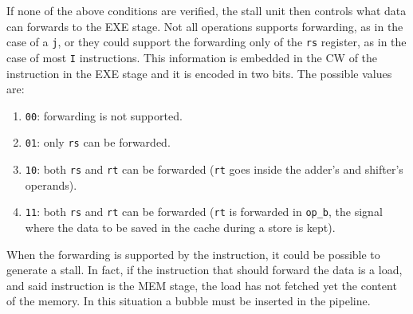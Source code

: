 If none of the above conditions are verified, the stall unit then controls what data can forwards to the EXE stage. Not all operations supports forwarding, as in the case of a \verb|j|, or they could support the
forwarding only of the \verb|rs| register, as in the case of most \verb|I| instructions. This information is embedded in the CW of the instruction in the EXE stage and it is encoded in two bits. The possible values are:

\begin{enumerate}
    \item \verb|00|: forwarding is not supported.
    \item \verb|01|: only \verb|rs| can be forwarded.
    \item \verb|10|: both \verb|rs| and \verb|rt| can be forwarded (\verb|rt| goes inside the adder's and shifter's operands).
    \item \verb|11|: both \verb|rs| and \verb|rt| can be forwarded (\verb|rt| is forwarded in \verb|op_b|, the signal where the data to be saved in the cache during a store is kept).
\end{enumerate}

When the forwarding is supported by the instruction, it could be possible to generate a stall. In fact, if the instruction that should forward the data is a load, and said instruction is the MEM stage,
the load has not fetched yet the content of the memory. In this situation a bubble must be inserted in the pipeline.